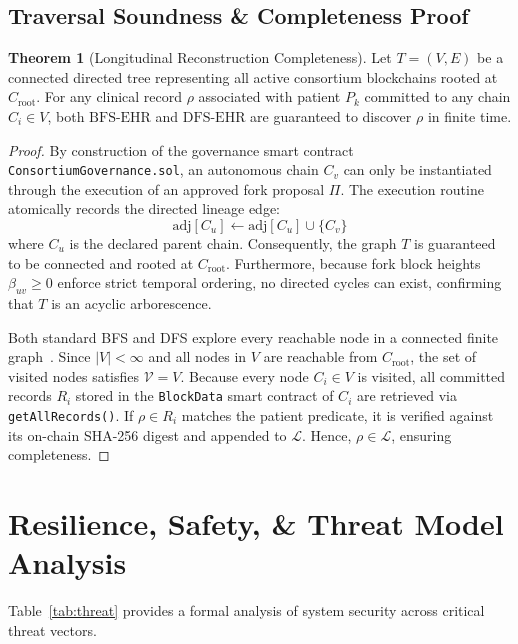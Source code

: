 \documentclass[conference]{IEEEtran}
\theoremstyle{definition}
\newtheorem{theorem}{Theorem}
\begin{document}
\subsection{Traversal Soundness \& Completeness Proof}

\begin{theorem}[Longitudinal Reconstruction Completeness]
Let $T = (V, E)$ be a connected directed tree representing all active consortium blockchains rooted at $C_{\text{root}}$. For any clinical record $\rho$ associated with patient $P_k$ committed to any chain $C_i \in V$, both $\text{BFS-EHR}$ and $\text{DFS-EHR}$ are guaranteed to discover $\rho$ in finite time.
\end{theorem}

\begin{proof}
By construction of the governance smart contract \texttt{ConsortiumGovernance.sol}, an autonomous chain $C_v$ can only be instantiated through the execution of an approved fork proposal $\Pi$. The execution routine atomically records the directed lineage edge:
\begin{equation}
\text{adj}[C_u] \leftarrow \text{adj}[C_u] \cup \{C_v\}
\end{equation}
where $C_u$ is the declared parent chain. Consequently, the graph $T$ is guaranteed to be connected and rooted at $C_{\text{root}}$. Furthermore, because fork block heights $\beta_{uv} \ge 0$ enforce strict temporal ordering, no directed cycles can exist, confirming that $T$ is an acyclic arborescence.

Both standard BFS and DFS explore every reachable node in a connected finite graph~\cite{cormen2022introduction}. Since $|V| < \infty$ and all nodes in $V$ are reachable from $C_{\text{root}}$, the set of visited nodes satisfies $\mathcal{V} = V$. Because every node $C_i \in V$ is visited, all committed records $R_i$ stored in the \texttt{BlockData} smart contract of $C_i$ are retrieved via \texttt{getAllRecords()}. If $\rho \in R_i$ matches the patient predicate, it is verified against its on-chain SHA-256 digest and appended to $\mathcal{L}$. Hence, $\rho \in \mathcal{L}$, ensuring completeness.
\end{proof}

\section{Resilience, Safety, \& Threat Model Analysis}

Table~\ref{tab:threat} provides a formal analysis of system security across critical threat vectors.
\end{document}
